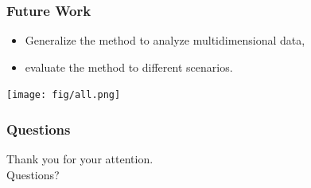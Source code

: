 \begin{frame}
   \frametitle{Future Work}
		\vfill
    \begin{itemize}
        \item Generalize the method to analyze multidimensional data,
        \item evaluate the method to different scenarios.
		\vfill
    \end{itemize}
    \texttt{[image: fig/all.png]}
		\vfill
\end{frame}



\begin{frame}
	\frametitle{Questions}
	\begin{center}
		\vfill
		Thank you for your attention.\\
		\vfill
		Questions?
		\vfill
	\end{center}
\end{frame}



